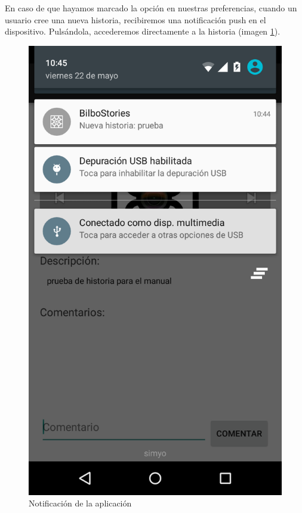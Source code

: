 \documentclass[11pt,a4paper, titlepage]{article}
\begin{document}
	En caso de que hayamos marcado la opción en nuestras preferencias, cuando un usuario cree una nueva historia, recibiremos una notificación push en el dispositivo. Pulsándola, accederemos directamente a la historia (imagen \ref{p21}).
	
	\begin{figure}[hbtp]
		\centering
		\includegraphics[scale = 0.25 ]{img/16}
		\caption{Notificación de la aplicación}
		\label{p21}
	\end{figure}
	
\end{document}
